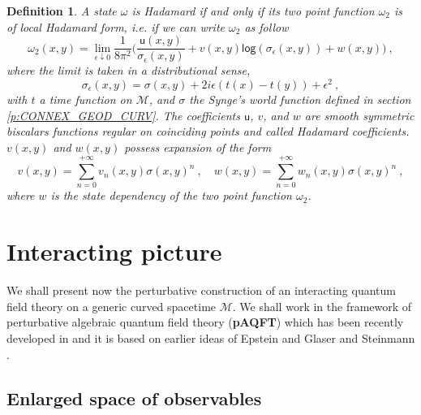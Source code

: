 \documentclass[11pt]{book}
\renewcommand{\log}{\mathsf{log}}
\newcommand{\Mcal}{\mathcal{M}}
\newcommand{\usf}{\mathsf{u}}
\theoremstyle{break}
\newtheorem{definition}{Definition}[chapter]
\begin{document}
\begin{definition}\label{def:loc_form_hadamard}
A state $\omega$ is Hadamard if and only if its two point function $\omega_2$ is of local Hadamard form, i.e. if we can write $\omega_2$ as follow
%
\begin{equation*}
\omega_2(x,y) = \lim_{\epsilon \downarrow 0} \frac{1}{8\pi^2} \bigg( \frac{\usf(x,y)}{\sigma_\epsilon(x,y)} + v(x,y) \log\left( \sigma_\epsilon(x,y) \right) + w(x,y) \bigg) \ ,
\end{equation*}
%
where the limit is taken in a distributional sense, 
%
\begin{equation*}
\sigma_\epsilon(x,y) = \sigma(x,y) + 2 i \epsilon \left( t(x) -t(y)\right) + \epsilon^2 \ , 
\end{equation*}
%
with $t$ a time function on $\Mcal$, and $\sigma$ the Synge's world function defined in section \ref{p:CONNEX_GEOD_CURV}. The coefficients $\usf$, $v$, and $w$ are smooth symmetric biscalars functions regular on coinciding points and called Hadamard coefficients. $v(x,y)$ and $w(x,y)$ possess expansion of the form
%
\begin{equation*}
v(x,y) = \sum_{n=0}^{+\infty} v_n(x,y) \sigma(x,y)^n \ , \quad 
w(x,y) = \sum_{n=0}^{+\infty} w_n(x,y) \sigma(x,y)^n \ ,
\end{equation*}
%
where $w$ is the state dependency of the two point function $\omega_2$.
\end{definition}


\section{Interacting picture}
\label{p:INTERACTING_PICTURE}


We shall present now the perturbative construction of an interacting quantum field theory on a generic curved spacetime $\Mcal$. We shall work in the framework of perturbative algebraic quantum field theory (\textbf{pAQFT}) which has been recently developed in \cite{brunetti_perturbative_2009,fredenhagen_perturbative_2015,fredenhagen_batalin-vilkovisky_2013} and it is based on earlier ideas of Epstein and Glaser and Steinmann \cite{epstein_glaser,steinmann_perturbation_1971}.


\subsection{Enlarged space of observables}
\label{p:OBS_ENLARGED}
\end{document}
